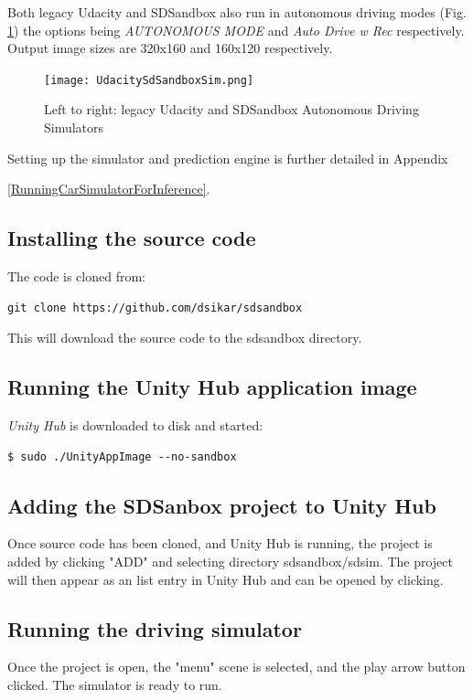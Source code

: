 Both legacy Udacity and SDSandbox also run in autonomous driving modes (Fig. \ref{fig:UdacitySdSandboxAutonomous}) the options being \textit{AUTONOMOUS MODE} and \textit{Auto Drive w Rec} respectively. Output image sizes are 320x160 and 160x120 respectively.


\begin{figure}[h!]
\centering
\texttt{[image: UdacitySdSandboxSim.png]}
\caption{Left to right: legacy Udacity and SDSandbox Autonomous Driving Simulators}
\label{fig:UdacitySdSandboxAutonomous}
\end{figure}

Setting up the simulator and prediction engine is further detailed in Appendix

\ref{RunningCarSimulatorForInference}.

\subsection{Installing the source code}
\label{installing-source-code}
The code is cloned from:
\begin{verbatim}
git clone https://github.com/dsikar/sdsandbox    
\end{verbatim}
This will download the source code to the sdsandbox directory.

\subsection{Running the Unity Hub application image}


\textit{Unity Hub} is downloaded to disk and started:
\begin{verbatim}
$ sudo ./UnityAppImage --no-sandbox
\end{verbatim}

\subsection{Adding the SDSanbox project to Unity Hub}

Once source code has been cloned, and Unity Hub is running, the project is added by clicking "ADD" and selecting directory sdsandbox/sdsim. The project will then appear as an list entry in Unity Hub and can be opened by clicking.

\subsection{Running the driving simulator}
\label{running-driving simulator}
Once the project is open, the "menu" scene is selected, and the play arrow button clicked. The simulator is ready to run.

